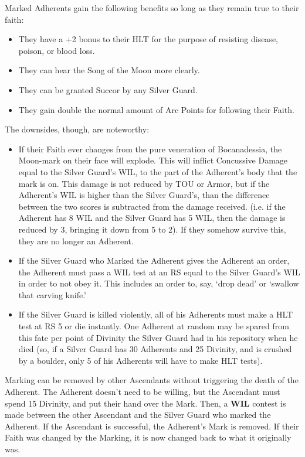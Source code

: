 \documentclass[oneside,11pt,english]{book}
\begin{document}
Marked Adherents gain the following benefits so long as they remain true to their faith: 
\begin{itemize}
\item They have a +2 bonus to their HLT for the purpose of resisting disease, poison, or blood 
loss. 
\item They can hear the Song of the Moon more clearly. 
\item They can be granted Succor by any Silver Guard. 
\item They gain double the normal amount of Arc Points for following their Faith. 
\end{itemize}
The downsides, though, are noteworthy: 
\begin{itemize}
\item If their Faith ever changes from the pure veneration of Bocanadessia, the Moon-mark on 
their face will explode. This will inflict Concussive Damage equal to the Silver Guard's 
WIL, to the part of the Adherent's body that the mark is on. This damage is not reduced 
by TOU or Armor, but if the Adherent's WIL is higher than the Silver Guard's, than the 
difference between the two scores is subtracted from the damage received. (i.e. if the 
Adherent has 8 WIL and the Silver Guard has 5 WIL, then the damage is reduced by 3, 
bringing it down from 5 to 2). If they somehow survive this, they are no longer an 
Adherent. 
\item If the Silver Guard who Marked the Adherent gives the Adherent an order, the Adherent 
must pass a WIL test at an RS equal to the Silver Guard's WIL in order to not obey it. 
This includes an order to, say, ‘drop dead’ or ‘swallow that carving knife.’ 
\item If the Silver Guard is killed violently, all of his Adherents must make a HLT test at RS 5 
or die instantly. One Adherent at random may be spared from this fate per point of 
Divinity the Silver Guard had in his repository when he died (so, if a Silver Guard has 30 
Adherents and 25 Divinity, and is crushed by a boulder, only 5 of his Adherents will have 
to make HLT tests). 
\end{itemize}
Marking can be removed by other Ascendants without triggering the death of the Adherent. The 
Adherent doesn't need to be willing, but the Ascendant must spend 15 Divinity, and put their 
hand over the Mark. Then, a \textbf{WIL} contest is made between the other Ascendant and the Silver 
Guard who marked the Adherent. If the Ascendant is successful, the Adherent's Mark is removed. 
If their Faith was changed by the Marking, it is now changed back to what it originally was. 
\end{document}
